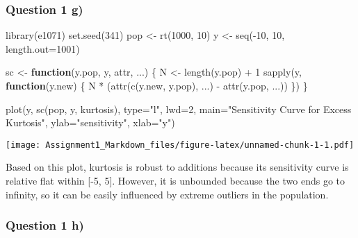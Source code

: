 \documentclass[
]{article}
\newenvironment{Shaded}{\begin{snugshade}}{\end{snugshade}}
\newcommand{\AttributeTok}[1]{\textcolor[rgb]{0.77,0.63,0.00}{#1}}
\newcommand{\ControlFlowTok}[1]{\textcolor[rgb]{0.13,0.29,0.53}{\textbf{#1}}}
\newcommand{\DecValTok}[1]{\textcolor[rgb]{0.00,0.00,0.81}{#1}}
\newcommand{\FunctionTok}[1]{\textcolor[rgb]{0.00,0.00,0.00}{#1}}
\newcommand{\NormalTok}[1]{#1}
\newcommand{\OtherTok}[1]{\textcolor[rgb]{0.56,0.35,0.01}{#1}}
\newcommand{\SpecialCharTok}[1]{\textcolor[rgb]{0.00,0.00,0.00}{#1}}
\newcommand{\StringTok}[1]{\textcolor[rgb]{0.31,0.60,0.02}{#1}}
\begin{document}
\newpage

\hypertarget{question-1-g}{%
\subsubsection{Question 1 g)}\label{question-1-g}}

\begin{Shaded}
\begin{Highlighting}[]
\FunctionTok{library}\NormalTok{(e1071)}
\FunctionTok{set.seed}\NormalTok{(}\DecValTok{341}\NormalTok{)}
\NormalTok{pop }\OtherTok{\textless{}{-}} \FunctionTok{rt}\NormalTok{(}\DecValTok{1000}\NormalTok{, }\DecValTok{10}\NormalTok{)}
\NormalTok{y }\OtherTok{\textless{}{-}} \FunctionTok{seq}\NormalTok{(}\SpecialCharTok{{-}}\DecValTok{10}\NormalTok{, }\DecValTok{10}\NormalTok{, }\AttributeTok{length.out=}\DecValTok{1001}\NormalTok{)}

\NormalTok{sc }\OtherTok{\textless{}{-}} \ControlFlowTok{function}\NormalTok{(y.pop, y, attr, ...) \{}
\NormalTok{  N }\OtherTok{\textless{}{-}} \FunctionTok{length}\NormalTok{(y.pop) }\SpecialCharTok{+} \DecValTok{1}
  \FunctionTok{sapply}\NormalTok{(y, }\ControlFlowTok{function}\NormalTok{(y.new) \{}
\NormalTok{    N }\SpecialCharTok{*}\NormalTok{ (}\FunctionTok{attr}\NormalTok{(}\FunctionTok{c}\NormalTok{(y.new, y.pop), ...) }\SpecialCharTok{{-}} \FunctionTok{attr}\NormalTok{(y.pop, ...))}
\NormalTok{  \})}
\NormalTok{\}}

\FunctionTok{plot}\NormalTok{(y, }\FunctionTok{sc}\NormalTok{(pop, y, kurtosis), }\AttributeTok{type=}\StringTok{"l"}\NormalTok{, }\AttributeTok{lwd=}\DecValTok{2}\NormalTok{,}
     \AttributeTok{main=}\StringTok{"Sensitivity Curve for Excess Kurtosis"}\NormalTok{,}
     \AttributeTok{ylab=}\StringTok{"sensitivity"}\NormalTok{, }\AttributeTok{xlab=}\StringTok{"y"}\NormalTok{)}
\end{Highlighting}
\end{Shaded}

\texttt{[image: Assignment1\_Markdown\_files/figure-latex/unnamed-chunk-1-1.pdf]}

Based on this plot, kurtosis is robust to additions because its
sensitivity curve is relative flat within {[}-5, 5{]}. However, it is
unbounded because the two ends go to infinity, so it can be easily
influenced by extreme outliers in the population.

\newpage

\hypertarget{question-1-h}{%
\subsubsection{Question 1 h)}\label{question-1-h}}
\end{document}
